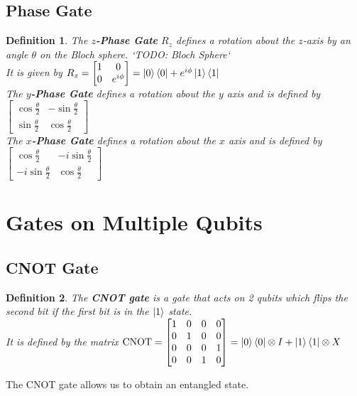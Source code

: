 \documentclass[12pt,twoside,fleqn]{report}
\theoremstyle{thmstyle}
\newtheorem{defn}{Definition}[chapter]
\begin{document}
\subsection{Phase Gate}
\begin{defn}
    The \textbf{$z$-Phase Gate} $R_z$ defines a rotation about the $z$-axis by an angle $\theta$ on the Bloch sphere. `TODO: Bloch Sphere`\\
    It is given by $R_z= \begin{bmatrix} 1 & 0 \\ 0 & e^{i\phi} \end{bmatrix} = \ket{0}\bra{0} + e^{i\phi} \ket{1}\bra{1}$ \\

    The \textbf{$y$-Phase Gate} defines a rotation about the $y$ axis and is defined by \\
    $\begin{bmatrix} \cos \frac{\theta}{2} & - \sin \frac{\theta}{2} \\ \sin \frac{\theta}{2} & \cos \frac{\theta}{2} \end{bmatrix}$ \\
    The \textbf{$x$-Phase Gate} defines a rotation about the $x$ axis and is defined by \\
    $\begin{bmatrix} \cos \frac{\theta}{2} & - i \sin \frac{\theta}{2} \\ - i \sin \frac{\theta}{2} & \cos \frac{\theta}{2} \end{bmatrix}$
\end{defn}

\section{Gates on Multiple Qubits}

\subsection{CNOT Gate}
\begin{defn}
    The \textbf{CNOT gate} is a gate that acts on 2 qubits which flips the second bit if the first bit is in the $\ket{1}$ state.\\
    It is defined by the matrix $\text{CNOT} = \begin{bmatrix} 1 & 0 & 0 & 0 \\ 0 & 1 & 0 & 0 \\ 0 & 0 & 0 & 1 \\ 0 & 0 & 1 & 0 \end{bmatrix} = \ket{0}\bra{0} \otimes I + \ket{1}\bra{1} \otimes X$
\end{defn}
The CNOT gate allows us to obtain an entangled state.
\end{document}
